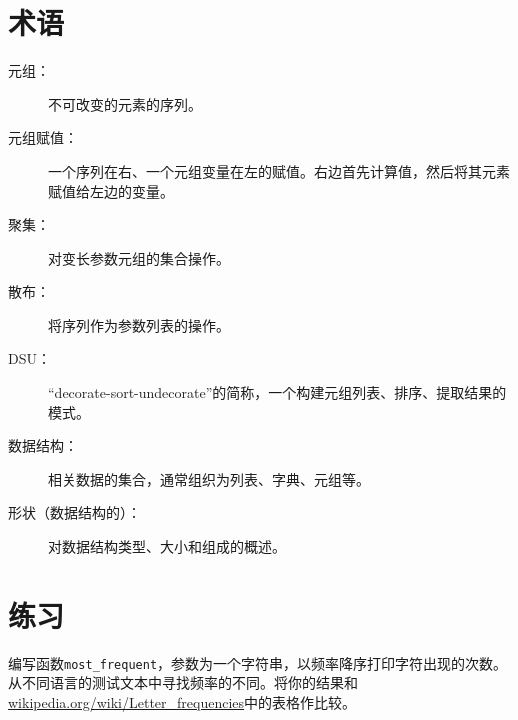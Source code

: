 \section{术语}

\begin{description}

\item[元组：] 不可改变的元素的序列。

\item[元组赋值：] 一个序列在右、一个元组变量在左的赋值。右边首先计算值，然后将其元素赋值给左边的变量。

\item[聚集：] 对变长参数元组的集合操作。

\item[散布：] 将序列作为参数列表的操作。

\item[DSU：] ``decorate-sort-undecorate''的简称，一个构建元组列表、排序、提取结果的模式。

\item[数据结构：] 相关数据的集合，通常组织为列表、字典、元组等。

\item[形状（数据结构的）：] 对数据结构类型、大小和组成的概述。

\end{description}


\section{练习}

\begin{ex}
编写函数\verb"most_frequent"，参数为一个字符串，以频率降序打印字符出现的次数。从不同语言的测试文本中寻找频率的不同。将你的结果和\url{wikipedia.org/wiki/Letter_frequencies}中的表格作比较。


\end{ex}


